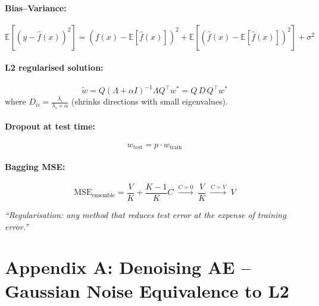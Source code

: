 \documentclass[12pt,a4paper]{article}
\newcommand{\E}{\mathbb{E}}
\begin{document}
\paragraph{Bias--Variance:}
\[
  \E\!\left[(y-\hat{f}(x))^2\right]
  = (f(x) - \E[\hat{f}(x)])^2
  + \E[(\hat{f}(x) - \E[\hat{f}(x)])^2]
  + \sigma^2
\]

\paragraph{L2 regularised solution:}
\[
  \tilde{w} = Q(\Lambda + \alpha I)^{-1}\Lambda Q^\top w^*
  = Q\,D\,Q^\top w^*
\]
where $D_{ii} = \frac{\lambda_i}{\lambda_i + \alpha}$ (shrinks directions with small eigenvalues).

\paragraph{Dropout at test time:}
\[
  w_{\text{test}} = p \cdot w_{\text{train}}
\]

\paragraph{Bagging MSE:}
\[
  \text{MSE}_{\text{ensemble}}
  = \frac{V}{K} + \frac{K-1}{K}C
  \;\xrightarrow{C=0}\;
  \frac{V}{K}
  \;\xrightarrow{C=V}\;
  V
\]

\begin{center}
\Large\textit{``Regularisation: any method that reduces test error at the expense of training error.''}
\end{center}

\appendix

\section{Appendix A: Denoising AE -- Gaussian Noise Equivalence to L2}
\end{document}
